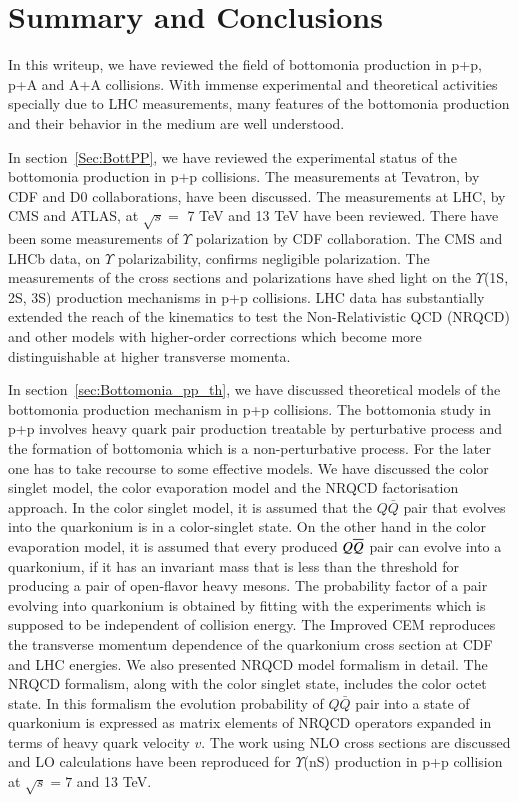 \section{Summary and Conclusions}
\label{sec:conclusions}

In this writeup, we have reviewed the field of bottomonia production in
p+p, p+A and A+A collisions. With immense experimental and theoretical activities
specially due to LHC measurements, many features of the bottomonia production
and their behavior in the medium are well understood.

In section~\ref{Sec:BottPP}, we have reviewed the experimental status of the bottomonia production
in p+p collisions. The measurements at Tevatron, by CDF and D0 collaborations,
have been discussed. The measurements at LHC, by CMS and ATLAS, at ${\sqrt s}=$ 7 TeV and
13 TeV have been reviewed. There have been some measurements 
of $\Upsilon$ polarization by CDF collaboration.
The CMS and LHCb data, on $\Upsilon$ polarizability, confirms 
negligible polarization. 
The measurements of the cross sections and polarizations have shed light on the
$\Upsilon$(1S, 2S, 3S) production mechanisms in p+p collisions.
LHC data has substantially extended the reach of the kinematics to test the
Non-Relativistic QCD (NRQCD) and other models with higher-order corrections which become more
distinguishable at higher transverse momenta.

In section~\ref{sec:Bottomonia_pp_th}, we have discussed theoretical models of the bottomonia production
mechanism in p+p collisions. The bottomonia study in p+p involves heavy quark
pair production treatable by perturbative process and the formation of bottomonia 
which is a non-perturbative process.
For the later one has to take recourse to some effective models. We have discussed the 
color singlet model, the color evaporation model and the NRQCD factorisation approach.
In the color singlet model, it is assumed that the $Q\bar Q$ pair that evolves into
the quarkonium is in a color-singlet state. 
On the other hand in the color evaporation model,
it is assumed that every produced $Q \overline{Q}$ pair can evolve into a quarkonium,
if it has an invariant mass that is less than the threshold for
producing a pair of open-flavor heavy mesons.
The probability factor of a pair evolving into quarkonium is obtained by fitting with
the experiments which is supposed to be independent of collision energy. 
The Improved CEM reproduces the transverse momentum dependence of the
quarkonium cross section at CDF and LHC energies.  
We also presented NRQCD model formalism in detail.
The NRQCD formalism, along with the color singlet state, includes the color octet state.
In this formalism the evolution probability of $Q\bar{Q}$
pair into a state of quarkonium is expressed as matrix elements of NRQCD operators
expanded in terms of heavy quark velocity $v$.
The work using NLO cross sections are discussed and LO calculations have been
reproduced for $\Upsilon$(nS) production in p+p collision at $\sqrt s = 7$ and 13 TeV.

